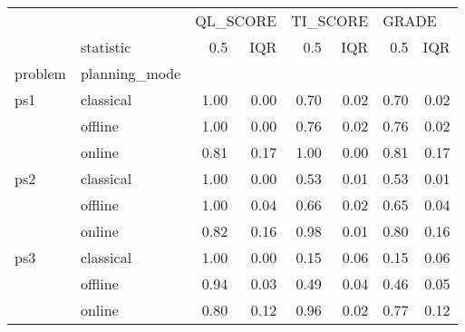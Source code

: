 \begin{tabular}{llrrrrrr}
\toprule
    & {} & \multicolumn{2}{l}{QL\_SCORE} & \multicolumn{2}{l}{TI\_SCORE} & \multicolumn{2}{l}{GRADE} \\
    & statistic &      0.5 &  IQR &      0.5 &  IQR &   0.5 &  IQR \\
problem & planning\_mode &          &      &          &      &       &      \\
\midrule
ps1 & classical &     1.00 & 0.00 &     0.70 & 0.02 &  0.70 & 0.02 \\
    & offline &     1.00 & 0.00 &     0.76 & 0.02 &  0.76 & 0.02 \\
    & online &     0.81 & 0.17 &     1.00 & 0.00 &  0.81 & 0.17 \\
ps2 & classical &     1.00 & 0.00 &     0.53 & 0.01 &  0.53 & 0.01 \\
    & offline &     1.00 & 0.04 &     0.66 & 0.02 &  0.65 & 0.04 \\
    & online &     0.82 & 0.16 &     0.98 & 0.01 &  0.80 & 0.16 \\
ps3 & classical &     1.00 & 0.00 &     0.15 & 0.06 &  0.15 & 0.06 \\
    & offline &     0.94 & 0.03 &     0.49 & 0.04 &  0.46 & 0.05 \\
    & online &     0.80 & 0.12 &     0.96 & 0.02 &  0.77 & 0.12 \\
\bottomrule
\end{tabular}

